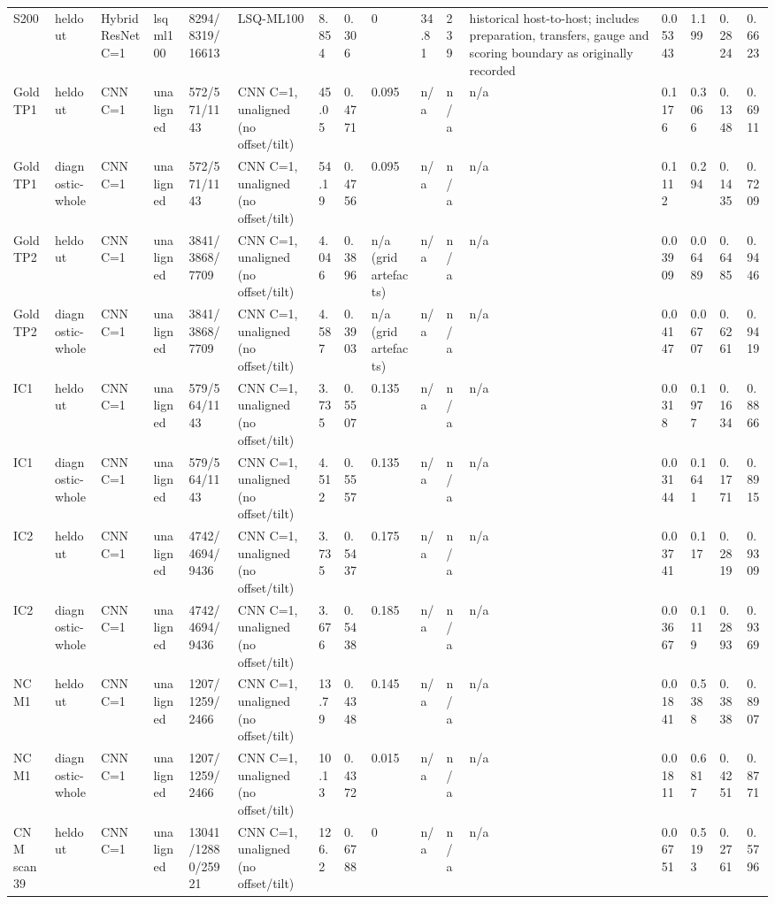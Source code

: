 \begin{tabular}{llllllllllllllll}
S200 & heldout & Hybrid ResNet C=1 & lsqml100 & 8294/8319/16613 & LSQ-ML100 & 8.854 & 0.306 & 0 & 34.81 & 239 & historical host-to-host; includes preparation, transfers, gauge and scoring boundary as originally recorded & 0.05343 & 1.199 & 0.2824 & 0.6623 \\
Gold TP1 & heldout & CNN C=1 & unaligned & 572/571/1143 & CNN C=1, unaligned (no offset/tilt) & 45.05 & 0.4771 & 0.095 & n/a & n/a & n/a & 0.1176 & 0.3066 & 0.1348 & 0.6911 \\
Gold TP1 & diagnostic-whole & CNN C=1 & unaligned & 572/571/1143 & CNN C=1, unaligned (no offset/tilt) & 54.19 & 0.4756 & 0.095 & n/a & n/a & n/a & 0.1112 & 0.294 & 0.1435 & 0.7209 \\
Gold TP2 & heldout & CNN C=1 & unaligned & 3841/3868/7709 & CNN C=1, unaligned (no offset/tilt) & 4.046 & 0.3896 & n/a (grid artefacts) & n/a & n/a & n/a & 0.03909 & 0.06489 & 0.6485 & 0.9446 \\
Gold TP2 & diagnostic-whole & CNN C=1 & unaligned & 3841/3868/7709 & CNN C=1, unaligned (no offset/tilt) & 4.587 & 0.3903 & n/a (grid artefacts) & n/a & n/a & n/a & 0.04147 & 0.06707 & 0.6261 & 0.9419 \\
IC1 & heldout & CNN C=1 & unaligned & 579/564/1143 & CNN C=1, unaligned (no offset/tilt) & 3.735 & 0.5507 & 0.135 & n/a & n/a & n/a & 0.0318 & 0.1977 & 0.1634 & 0.8866 \\
IC1 & diagnostic-whole & CNN C=1 & unaligned & 579/564/1143 & CNN C=1, unaligned (no offset/tilt) & 4.512 & 0.5557 & 0.135 & n/a & n/a & n/a & 0.03144 & 0.1641 & 0.1771 & 0.8915 \\
IC2 & heldout & CNN C=1 & unaligned & 4742/4694/9436 & CNN C=1, unaligned (no offset/tilt) & 3.735 & 0.5437 & 0.175 & n/a & n/a & n/a & 0.03741 & 0.117 & 0.2819 & 0.9309 \\
IC2 & diagnostic-whole & CNN C=1 & unaligned & 4742/4694/9436 & CNN C=1, unaligned (no offset/tilt) & 3.676 & 0.5438 & 0.185 & n/a & n/a & n/a & 0.03667 & 0.1119 & 0.2893 & 0.9369 \\
NCM1 & heldout & CNN C=1 & unaligned & 1207/1259/2466 & CNN C=1, unaligned (no offset/tilt) & 13.79 & 0.4348 & 0.145 & n/a & n/a & n/a & 0.01841 & 0.5388 & 0.3838 & 0.8907 \\
NCM1 & diagnostic-whole & CNN C=1 & unaligned & 1207/1259/2466 & CNN C=1, unaligned (no offset/tilt) & 10.13 & 0.4372 & 0.015 & n/a & n/a & n/a & 0.01811 & 0.6817 & 0.4251 & 0.8771 \\
CNM scan39 & heldout & CNN C=1 & unaligned & 13041/12880/25921 & CNN C=1, unaligned (no offset/tilt) & 126.2 & 0.6788 & 0 & n/a & n/a & n/a & 0.06751 & 0.5193 & 0.2761 & 0.5796 \\

\end{tabular}

